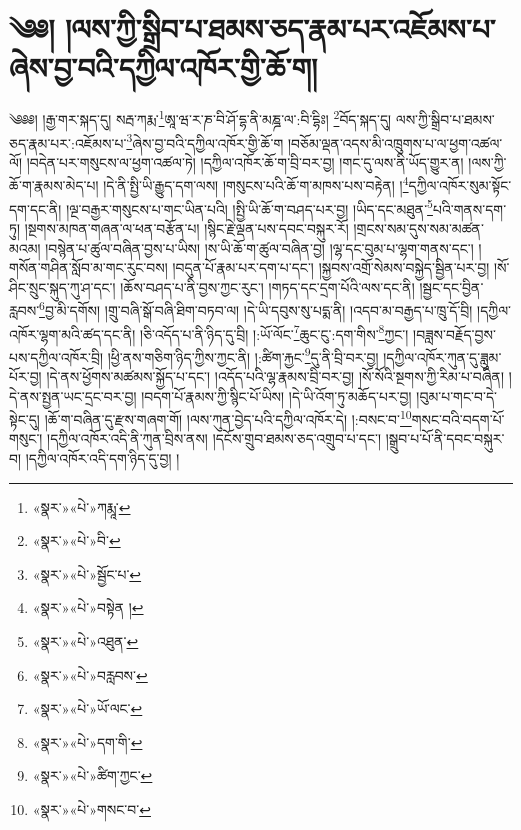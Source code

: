 \chapter{༄༅། །ལས་ཀྱི་སྒྲིབ་པ་ཐམས་ཅད་རྣམ་པར་འཇོམས་པ་ཞེས་བྱ་བའི་དཀྱིལ་འཁོར་གྱི་ཆོ་ག།}༄༅༅། །རྒྱ་གར་སྐད་དུ། སརྦ་ཀརྨ་\footnote{«སྣར་»«པེ་»ཀརྨཱ་}ཨཱ་ཝ་ར་ཎ་བི་ཤོ་དྷ་ནི་མཎྜ་ལ་:བི་དྷིཿ། \footnote{«སྣར་»«པེ་»བི་}བོད་སྐད་དུ། ལས་ཀྱི་སྒྲིབ་པ་ཐམས་ཅད་རྣམ་པར་:འཇོམས་པ་\footnote{«སྣར་»«པེ་»སྦྱོང་པ་}ཞེས་བྱ་བའི་དཀྱིལ་འཁོར་གྱི་ཆོ་ག །བཅོམ་ལྡན་འདས་མི་འཁྲུགས་པ་ལ་ཕྱག་འཚལ་ལོ། །བདེན་པར་གསུངས་ལ་ཕྱག་འཚལ་ཏེ། །དཀྱིལ་འཁོར་ཆོ་ག་བྲི་བར་བྱ། །གང་དུ་ལས་ནི་ཡོད་གྱུར་ན། །ལས་ཀྱི་ཆོ་ག་རྣམས་མེད་པ། །དེ་ནི་སྤྱི་ཡི་རྒྱུད་དག་ལས། །གསུངས་པའི་ཆོ་ག་མཁས་པས་བརྟེན། །\footnote{«སྣར་»«པེ་»བསྟེན །}དཀྱིལ་འཁོར་སུམ་སྟོང་དག་དང་ནི། །ལྔ་བརྒྱར་གསུངས་པ་གང་ཡིན་པའི། །སྤྱི་ཡི་ཆོ་ག་བཤད་པར་བྱ། །ཡིད་དང་མཐུན་\footnote{«སྣར་»«པེ་»འཐུན་}པའི་གནས་དག་ཏུ། །སྔགས་མཁན་གཞན་ལ་ཕན་བརྩོན་པ། །སྙིང་རྗེ་ལྡན་པས་དབང་བསྐུར་རོ། །གྲངས་སམ་དུས་སམ་མཚན་མའམ། །བསྙེན་པ་ཚུལ་བཞིན་བྱས་པ་ཡིས། །ས་ཡི་ཆོ་ག་ཚུལ་བཞིན་བྱ། །ལྷ་དང་བུམ་པ་ལྷག་གནས་དང་། །གསོན་གཤིན་སློབ་མ་གང་རུང་བས། །བདུན་པོ་རྣམ་པར་དག་པ་དང་། །སྐྱབས་འགྲོ་སེམས་བསྐྱེད་སྦྱིན་པར་བྱ། །སོ་ཤིང་སྲུང་སྐུད་ཀུ་ཤ་དང་། །ཆོས་བཤད་པ་ནི་བྱས་ཀྱང་རུང་། །གཏད་དང་དྲག་པོའི་ལས་དང་ནི། །སྦྱང་དང་བྱིན་རླབས་\footnote{«སྣར་»«པེ་»བརླབས་}བྱ་མི་དགོས། །གྲུ་བཞི་སྒོ་བཞི་ཐིག་བཏབ་ལ། །དེ་ཡི་དབུས་སུ་པདྨ་ནི། །འདབ་མ་བརྒྱད་པ་ཁྲུ་དོ་བྲི། །དཀྱིལ་འཁོར་ལྷག་མའི་ཚད་དང་ནི། །ཅི་འདོད་པ་ནི་ཉིད་དུ་བྲི། །:ཡོ་ལོང་\footnote{«སྣར་»«པེ་»ཡོ་ལང་}ཆུང་ངུ་:དག་གིས་\footnote{«སྣར་»«པེ་»དག་གི་}ཀྱང་། །བཟླས་བརྗོད་བྱས་པས་དཀྱིལ་འཁོར་བྲི། །ཕྱི་ནས་གཅིག་ཉིད་ཀྱིས་ཀྱང་ནི། །:ཚིག་རྐྱང་\footnote{«སྣར་»«པེ་»ཚིག་ཀྱང་}དུ་ནི་བྲི་བར་བྱ། །དཀྱིལ་འཁོར་ཀུན་དུ་ཟླུམ་པོར་བྱ། །དེ་ནས་ཕྱོགས་མཚམས་སྐྱོད་པ་དང་། །འདོད་པའི་ལྷ་རྣམས་བྲི་བར་བྱ། །སོ་སོའི་སྔགས་ཀྱི་རིམ་པ་བཞིན། །དེ་ནས་སྤྱན་ཡང་དྲང་བར་བྱ། །བདག་པོ་རྣམས་ཀྱི་སྙིང་པོ་ཡིས། །དེ་ཡི་འོག་ཏུ་མཆོད་པར་བྱ། །བུམ་པ་གང་བ་དེ་སྟེང་དུ། །ཆོ་ག་བཞིན་དུ་རྫས་གཞག་གོ། །ལས་ཀུན་བྱེད་པའི་དཀྱིལ་འཁོར་དེ། །:བསང་བ་\footnote{«སྣར་»«པེ་»གསང་བ་}གསང་བའི་བདག་པོ་གསུང་། །དཀྱིལ་འཁོར་འདི་ནི་ཀུན་བྲིས་ནས། །དངོས་གྲུབ་ཐམས་ཅད་འགྲུབ་པ་དང་། །སྒྲུབ་པ་པོ་ནི་དབང་བསྐུར་བ། །དཀྱིལ་འཁོར་འདི་དག་ཉིད་དུ་བྱ། །
